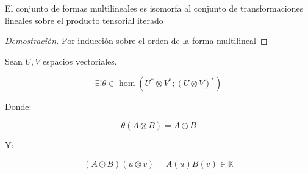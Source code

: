 \begin{thm}[$\operatorname{Mult}^r(\{E_i\}_{i=1}^r; F) \cong \operatorname{Hom}(\bigotimes_{}\{E_i\}_{i=1}^r; F)$]
	El conjunto de formas multilineales es isomorfa al conjunto de transformaciones lineales sobre el producto tensorial iterado
\end{thm}

\begin{proof}[Demostración]
	Por inducción sobre el orden de la forma multilineal
\end{proof}




\begin{thm}
	Sean $U,V$ espacios vectoriales.
	
	\begin{equation*}
		\exists ! \theta \in \hom(U^* \otimes V^* ; (U \otimes V)^*)
	\end{equation*}
	
	Donde:
	
	\begin{equation*}
		\theta (A\otimes B) = A\odot B
	\end{equation*}
	
	Y:
	
	\begin{equation*}
		(A\odot B)(u\otimes v) = A(u)B(v) \in \mathbb{K}
	\end{equation*}
\end{thm}

